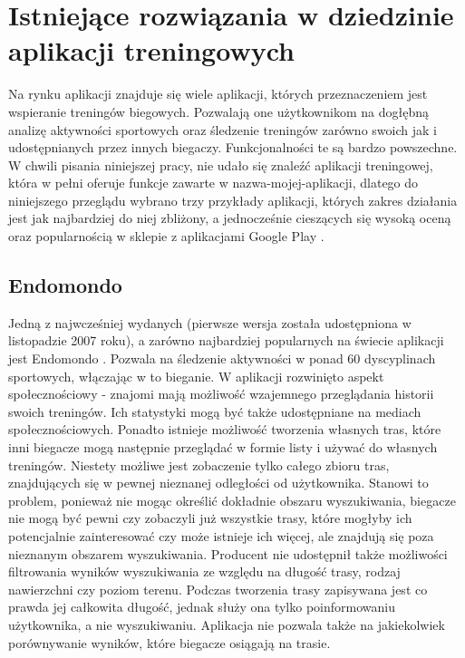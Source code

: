 \section{Istniejące rozwiązania w dziedzinie aplikacji treningowych}\label{chap:istniejace}
Na rynku aplikacji znajduje się wiele aplikacji, których przeznaczeniem jest wspieranie treningów biegowych. Pozwalają one użytkownikom na dogłębną analizę aktywności sportowych oraz śledzenie treningów zarówno swoich jak i udostępnianych przez innych biegaczy. Funkcjonalności te są bardzo powszechne. W chwili pisania niniejszej pracy, nie udało się znaleźć aplikacji treningowej, która w pełni oferuje funkcje zawarte w nazwa-mojej-aplikacji, dlatego do niniejszego przeglądu wybrano trzy przykłady aplikacji, których zakres działania jest jak najbardziej do niej zbliżony, a jednocześnie cieszących się wysoką oceną oraz popularnością w sklepie z aplikacjami Google Play \cite{googleplay}. 
\subsection{Endomondo}
Jedną z najwcześniej wydanych (pierwsze wersja została udostępniona w listopadzie 2007 roku), a zarówno najbardziej popularnych na świecie aplikacji jest Endomondo \cite{endomondo}.  Pozwala na śledzenie aktywności w ponad 60 dyscyplinach sportowych, włączając w to bieganie. W aplikacji rozwinięto aspekt społecznościowy - znajomi mają możliwość wzajemnego przeglądania historii swoich treningów. Ich statystyki mogą być także udostępniane na mediach społecznościowych. Ponadto istnieje możliwość tworzenia własnych tras, które inni biegacze mogą następnie przeglądać w formie listy i używać do własnych treningów. Niestety możliwe jest zobaczenie tylko całego zbioru tras, znajdujących się w pewnej nieznanej odległości od użytkownika. Stanowi to problem, ponieważ nie mogąc określić dokładnie obszaru wyszukiwania, biegacze nie mogą być pewni czy zobaczyli już wszystkie trasy, które mogłyby ich potencjalnie zainteresować czy może istnieje ich więcej, ale znajdują się poza nieznanym obszarem wyszukiwania. Producent nie udostępnił także możliwości filtrowania wyników wyszukiwania ze względu na długość trasy, rodzaj nawierzchni czy poziom terenu. Podczas tworzenia trasy zapisywana jest co prawda jej całkowita długość, jednak służy ona tylko poinformowaniu użytkownika, a nie wyszukiwaniu. Aplikacja nie pozwala także na jakiekolwiek porównywanie wyników, które biegacze osiągają na trasie.
